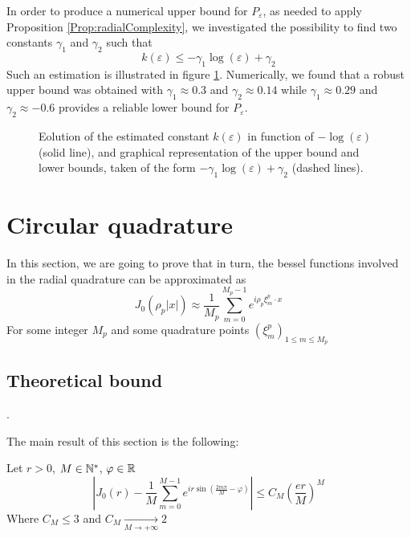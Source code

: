 \documentclass[11pt,a4paper]{article}
\begin{document}
In order to produce a numerical upper bound for $P_{\varepsilon}$, as needed to apply Proposition \ref{Prop:radialComplexity}, we investigated the possibility to find two constants $\gamma_1$ and $\gamma_2$ such that 
 \[k(\varepsilon) \leq - \gamma_1 \log(\varepsilon) + \gamma_2\]
Such an estimation is illustrated in figure \ref{Estimationk(eps)}. Numerically, we found that a robust upper bound was obtained with $\gamma_1 \approx 0.3$ and $\gamma_2 \approx 0.14$ while $\gamma_1 \approx 0.29$ and $\gamma_2 \approx -0.6$ provides a reliable lower bound for $P_{\varepsilon}$.  

\begin{figure}[H]
\centering

\caption{Eolution of the estimated constant $k(\varepsilon)$ in function of $-\log(\varepsilon)$ (solid line), and graphical representation of the upper bound and lower bounds, taken of the form $-\gamma_1 \log(\varepsilon)+\gamma_2$ (dashed lines). }
\label{Estimationk(eps)}
\end{figure}

\section{Circular quadrature}
\label{sec:circular}
In this section, we are going to prove that in turn, the bessel functions involved in the radial quadrature can be approximated as 
\[ J_0(\rho_p|x|) \approx \dfrac{1}{M_p}\sum_{m=0}^{M_p-1}e^{i \rho_p \xi^p_m \cdot x} \]
For some integer $M_p$ and some quadrature points $(\xi_m^p)_{1 \leq m \leq M_p}$

\subsection{Theoretical bound}. 

The main result of this section is the following: 
\begin{Prop} Let $r>0$, $M\in \mathbb{N}^*$, $\varphi \in \mathbb{R}$ 
\[\left|J_0(r) -  \dfrac{1}{M}\sum_{m=0}^{M-1}e^{ir\sin\left(\frac{2m\pi}{M}-\varphi\right)} \right| \leq C_M \left(\dfrac{er}{M}\right)^M\]
Where $C_M \leq 3$ and $C_M \underset{M\to+\infty}{\longrightarrow} 2$
\label{QuadratureCirc}
\end{Prop}
\end{document}
